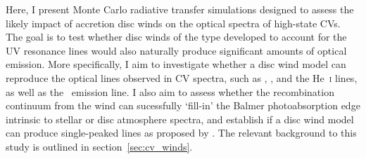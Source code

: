 

\nocite{groot2004}
\nocite{beuermann1990}
\nocite{beuermann1992}
\nocite{higginbottom2013}

Here, I present Monte Carlo radiative transfer simulations designed
to assess the likely impact of accretion disc winds on the
optical spectra of high-state CVs. The goal is to
test whether disc winds of the type developed to account for the UV
resonance lines would also naturally produce significant amounts of  
optical emission. More specifically, I aim to investigate whether a 
disc wind model can reproduce the optical lines observed in CV spectra,
such as \ha, \hb, \heiiopt and the He~\textsc{i} lines, as well as
the \heiiuv\ emission line. I also aim to assess whether the recombination
continuum from the wind can sucessfully `fill-in' the Balmer photoabsorption
edge intrinsic to stellar or disc atmosphere spectra, and establish
if a disc wind model can produce single-peaked lines as proposed
by \cite[][hereafter referred to collectively as MC96]{MC96,MC97}.
The relevant background to this study is outlined in section~\ref{sec:cv_winds}.

